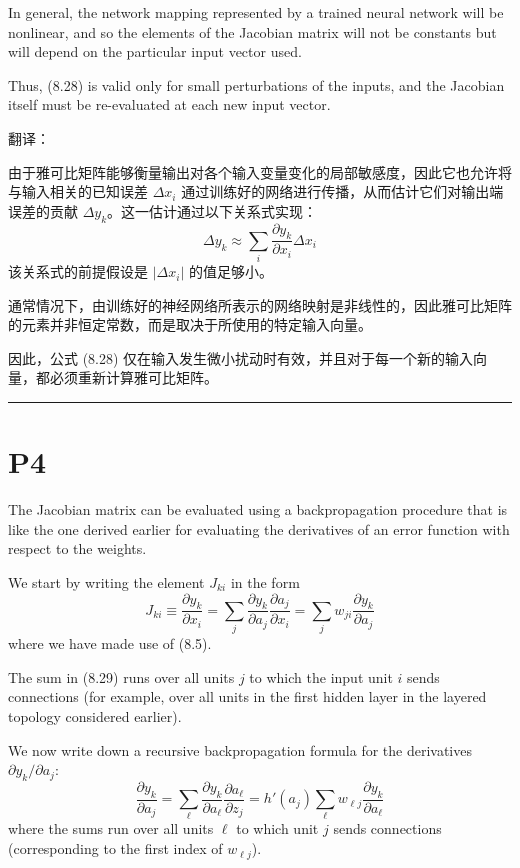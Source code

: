 \documentclass{article}
\begin{document}
In general, the network mapping represented by a trained neural network will be nonlinear, and so the elements of the Jacobian matrix will not be constants but will depend on the particular input vector used. 

Thus, (8.28) is valid only for small perturbations of the inputs, and the Jacobian itself must be re-evaluated at each new input vector.

{\color{red}
翻译：

由于雅可比矩阵能够衡量输出对各个输入变量变化的局部敏感度，因此它也允许将与输入相关的已知误差 $\Delta x_i$ 通过训练好的网络进行传播，从而估计它们对输出端误差的贡献 $\Delta y_k$。这一估计通过以下关系式实现：
\begin{equation}
    \Delta y_k \approx \sum_i \frac{\partial y_k}{\partial x_i} \Delta x_i
    \tag{8.28}
\end{equation}
该关系式的前提假设是 $|\Delta x_i|$ 的值足够小。

通常情况下，由训练好的神经网络所表示的网络映射是非线性的，因此雅可比矩阵的元素并非恒定常数，而是取决于所使用的特定输入向量。

因此，公式 (8.28) 仅在输入发生微小扰动时有效，并且对于每一个新的输入向量，都必须重新计算雅可比矩阵。

}

\noindent\rule{\linewidth}{0.4pt}

\section{P4}

The Jacobian matrix can be evaluated using a backpropagation procedure that is like the one derived earlier for evaluating the derivatives of an error function with respect to the weights. 

We start by writing the element $J_{ki}$ in the form
\begin{equation}
    J_{ki} \equiv \frac{\partial y_k}{\partial x_i} = \sum_j \frac{\partial y_k}{\partial a_j} \frac{\partial a_j}{\partial x_i} = \sum_j w_{ji} \frac{\partial y_k}{\partial a_j}
    \tag{8.29}
\end{equation}
where we have made use of (8.5). 

The sum in (8.29) runs over all units $j$ to which the input unit $i$ sends connections (for example, over all units in the first hidden layer in the layered topology considered earlier). 

We now write down a recursive backpropagation formula for the derivatives $\partial y_k / \partial a_j$:
\begin{equation}
    \frac{\partial y_k}{\partial a_j} = \sum_\ell \frac{\partial y_k}{\partial a_\ell} \frac{\partial a_\ell}{\partial z_j} = h'(a_j) \sum_\ell w_{\ell j} \frac{\partial y_k}{\partial a_\ell}
    \tag{8.30}
\end{equation}
where the sums run over all units $\ell$ to which unit $j$ sends connections (corresponding to the first index of $w_{\ell j}$). 
\end{document}
